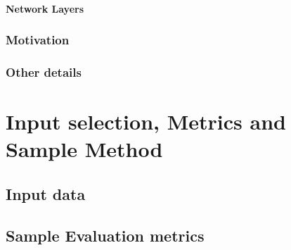 \paragraph{Network Layers}

\subsubsection{Motivation} %
\label{sec:arch_advantages}





\subsubsection{Other details} %



\section{Input selection, Metrics and Sample Method}
\label{sec:input_metrics_sample}
\subsection{Input data}
\label{sec:InputSelection}


\subsection{Sample Evaluation metrics}
\label{sec:evaluation}
